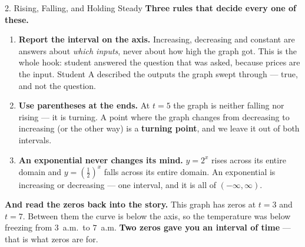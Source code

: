 \documentclass[10pt]{article}
\begin{document}
\begin{notesbox}{2. Rising, Falling, and Holding Steady}
\vspace{6pt}
\textbf{Three rules that decide every one of these.}
\begin{enumerate}[leftmargin=1.5em, itemsep=3pt, topsep=3pt]
  \item \textbf{Report the interval on the  axis.} Increasing, decreasing and constant
        are answers about \emph{which inputs}, never about how high the graph got. This is the whole
        hook: student  answered the question that was asked, because prices are the
        input. Student A described the outputs the graph swept through --- true, and not the
        question.
  \item \textbf{Use parentheses at the ends.} At $t=5$ the graph is neither falling nor rising --- it
        is turning. A point where the graph changes from decreasing to increasing (or the other way)
        is a \textbf{turning point}, and we leave it out of both intervals.
  \item \textbf{An exponential never changes its mind.} $y=2^x$ rises across its entire domain and
        $y=\left(\tfrac12\right)^x$ falls across its entire domain. An exponential is
         increasing or  decreasing --- one interval, and it is all of
        $(-\infty,\infty)$.
\end{enumerate}

\vspace{4pt}
\textbf{And read the zeros back into the story.} This graph has zeros at $t=3$ and $t=7$. Between
them the curve is below the axis, so the temperature was below freezing from $3$~a.m.\ to
$7$~a.m. \textbf{Two zeros gave you an interval of time} --- that is what zeros are for.
\end{notesbox}

\vspace{0.10in}
\end{document}
